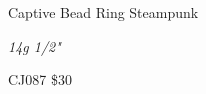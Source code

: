 \documentclass[8pt]{article}
\date{\today}
\title{}
\begin{document}
\begin{center}{\large{Captive Bead Ring Steampunk}}

\end{center}
\begin{center}{\Large\textit{14g 1/2"}}

\end{center}
\begin{center}{\large{CJ087\hspace{25mm}  \$30}}

\end{center}
\end{document}
